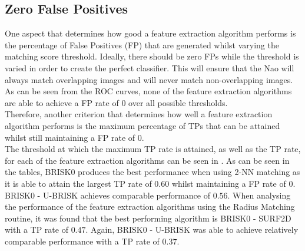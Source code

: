 \documentclass{report}
\begin{document}
%


\subsection{Zero False Positives}
\label{sec:zfp}
One aspect that determines how good a feature extraction algorithm performs is the percentage of False Positives (FP) that are generated whilst varying the matching score threshold. Ideally, there should be zero FPs while the threshold is varied in order to create the perfect classifier. This will ensure that the Nao will always match overlapping images and will never match non-overlapping images. As can be seen from the ROC curves, none of the feature extraction algorithms are able to achieve a FP rate of $0$ over all possible thresholds.\\

Therefore, another criterion that determines how well a feature extraction algorithm performs is the maximum percentage of TPs that can be attained whilst still maintaining a FP rate of $0$. \\

The threshold at which the maximum TP rate is attained, as well as the TP rate, for each of the feature extraction algorithms can be seen in . As can be seen in the tables, BRISK0 produces the best performance when using 2-NN matching as it is able to attain the largest TP rate of $0.60$ whilst maintaining a FP rate of $0$. BRISK0 - U-BRISK achieves comparable performance of $0.56$. When analysing the performance of the feature extraction algorithms using the Radius Matching routine, it was found that the best performing algorithm is BRISK0 - SURF2D with a TP rate of $0.47$. Again, BRISK0 - U-BRISK was able to achieve relatively comparable performance with a TP rate of $0.37$.\\
\end{document}
